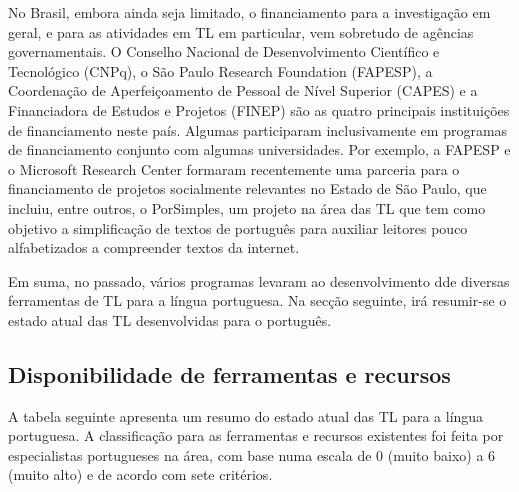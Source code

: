 \begin{multicols}{2}
No Brasil, embora ainda seja limitado, o financiamento para a investigação em geral, e para as atividades em TL em particular, vem sobretudo de agências governamentais. O Conselho Nacional de Desenvolvimento Científico e Tecnológico (CNPq), o São Paulo Research Foundation (FAPESP), a Coordenação de Aperfeiçoamento de Pessoal de Nível Superior (CAPES) e a Financiadora de Estudos e Projetos (FINEP) são as quatro principais instituições de financiamento neste país. Algumas participaram inclusivamente em programas de financiamento conjunto com algumas universidades. Por exemplo, a FAPESP e o Microsoft Research Center formaram recentemente uma parceria para o financiamento de projetos socialmente relevantes no Estado de São Paulo, que incluiu, entre outros, o PorSimples\cite{porsimples}, um projeto na área das TL que tem como objetivo a simplificação de textos de português para auxiliar leitores pouco alfabetizados a compreender textos da internet.

Em suma, no passado, vários programas levaram ao desenvolvimento dde diversas ferramentas de TL para a língua portuguesa. Na secção seguinte, irá resumir-se o estado atual das TL desenvolvidas para o português.

\subsection{Disponibilidade de ferramentas e recursos}

 A tabela seguinte apresenta um resumo do estado atual das TL para a língua portuguesa. A classificação para as ferramentas e recursos existentes foi feita por especialistas portugueses na área, com base numa escala de 0 (muito baixo) a 6 (muito alto) e de acordo com sete critérios.


\end{multicols}
